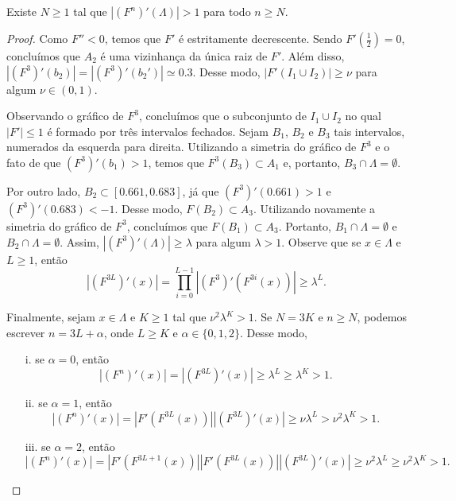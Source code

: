 \begin{lemma}
Existe $N \geq 1$ tal que $|(F^n)'(\Lambda)| > 1$ para todo $n \geq N$.
\end{lemma}


\begin{proof}
Como $F'' < 0$, temos que $F'$ é estritamente decrescente. Sendo $F'\left(\frac{1}{2}\right) = 0$, concluímos que $A_2$ é uma vizinhança da única raiz de $F'$. Além disso, $|(F^3)'(b_2)| = |(F^3)'(b_2')| \simeq 0.3$. Desse modo, $|F'(I_1 \cup I_2)| \geq \nu$ para algum $\nu \in (0, 1)$.

Observando o gráfico de $F^3$, concluímos que o subconjunto de $I_1 \cup I_2$ no qual $|F'| \leq 1$ é formado por três intervalos fechados. Sejam $B_1$, $B_2$ e $B_3$ tais intervalos, numerados da esquerda para direita. Utilizando a simetria do gráfico de $F^3$ e o fato de que $(F^3)'(b_1) > 1$, temos que $F^3(B_3) \subset A_1$ e, portanto, $B_3 \cap \Lambda = \emptyset$.

Por outro lado, $B_2 \subset [0.661, 0.683]$, já que $(F^3)'(0.661) > 1$ e $(F^3)'(0.683) < -1$. Desse modo, $F(B_2) \subset A_3$. Utilizando novamente a simetria do gráfico de $F^3$, concluímos que $F(B_1) \subset A_3$. Portanto, $B_1 \cap \Lambda = \emptyset$ e $B_2 \cap \Lambda = \emptyset$. Assim, $|(F^3)'(\Lambda)| \geq \lambda$ para algum $\lambda > 1$. Observe que se $x \in \Lambda$ e $L \geq 1$, então
$$\left| \left(F^{3L}\right)'(x) \right| = 
\prod_{i=0}^{L-1} \left| \left( F^3 \right)' \left( F^{3i}(x) \right) \right|
\geq \lambda^L.$$

Finalmente, sejam $x \in \Lambda$ e $K \geq 1$ tal que $\nu^2 \lambda^K > 1$. Se $N = 3K$ e $n \geq N$, podemos escrever $n = 3L + \alpha$, onde $L \geq K$ e $\alpha \in \{ 0, 1, 2 \}$. Desse modo,
\begin{enumerate}
\item[i.] se $\alpha = 0$, então
$$ \left| \left(F^n\right)'(x) \right|
= \left| \left(F^{3L}\right)'(x) \right|
\geq \lambda^L \geq \lambda^K > 1.$$
\item[ii.] se $\alpha = 1$, então
$$ \left| \left(F^n\right)'(x) \right|
= \left| F' \left(F^{3L}(x) \right) \right|
\left| \left(F^{3L}\right)'(x) \right|
\geq \nu \lambda^L > \nu^2 \lambda^K > 1.$$
\item[iii.] se $\alpha = 2$, então
$$ \left| \left(F^n\right)'(x) \right|
= \left| F' \left(F^{3L + 1}(x) \right) \right|
\left| F' \left(F^{3L}(x) \right) \right|
\left| \left(F^{3L}\right)'(x) \right|
\geq \nu^2 \lambda^L \geq \nu^2 \lambda^K > 1.$$
\end{enumerate}


\end{proof}


